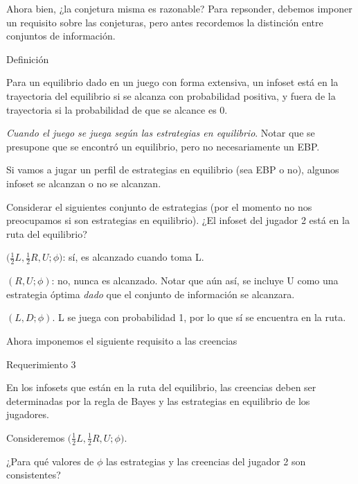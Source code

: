 \documentclass[12pt]{article}
\begin{document}
Ahora bien, ¿la conjetura misma es razonable? Para repsonder, debemos imponer un requisito sobre las conjeturas, pero antes recordemos la distinción entre conjuntos de información.

\begin{mybox}{Definición}
	\begin{defi}
		Para un equilibrio dado en un juego con forma extensiva, un infoset está en la trayectoria del equilibrio si se alcanza con probabilidad positiva, y fuera de la trayectoria si la probabilidad de que se alcance es 0.

		\textit{Cuando el juego se juega según las estrategias en equilibrio}. Notar que se presupone que se encontró un equilibrio, pero no necesariamente un EBP.
	\end{defi}

\end{mybox}

Si vamos a jugar un perfil de estrategias en equilibrio (sea EBP o no), algunos infoset se alcanzan o no se alcanzan.

Considerar el siguientes conjunto de estrategias (por el momento no nos preocupamos si son estrategias en equilibrio). ¿El infoset del jugador 2 está en la ruta del equilibrio?

\begin{myenum}
	\item $\biggl( \frac{1}{2}L, \frac{1}{2}R, U; \phi \biggr)$: sí, es alcanzado cuando toma L.
	\item $( R, U; \phi )$: no, nunca es alcanzado. Notar que aún así, se incluye U como una estrategia óptima \textit{dado} que el conjunto de información se alcanzara.
	\item $ (L, D; \phi) $. L se juega con probabilidad 1, por lo que sí se encuentra en la ruta.
\end{myenum}

Ahora imponemos el siguiente requisito a las creencias

\begin{mybox}{Requerimiento 3}

	En los infosets que están en la ruta del equilibrio, las creencias deben ser determinadas por la regla de Bayes y las estrategias en equilibrio de los jugadores.

\end{mybox}

Consideremos $\biggl( \frac{1}{2}L, \frac{1}{2}R, U; \phi \biggr)$.

¿Para qué valores de $ \phi $ las estrategias y las creencias del jugador 2 son consistentes?
\end{document}
